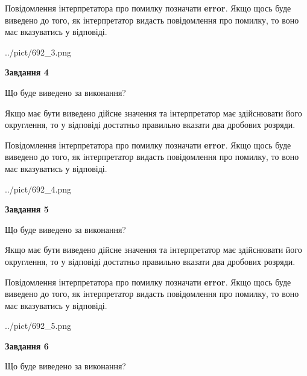 \documentclass[12pt, ukrainian]{article}
\begin{document}
{\begin {Large}
Повідомлення інтерпретатора про помилку позначати \textbf{error}.
Якщо щось буде виведено до того, як інтерпретатор видасть повідомлення про помилку, 
то воно має вказуватись у відповіді. \par

\begin{center}
	{../pict/692_3.png}
\end{center}
\newpage

{\begin {center}\textbf{Завдання 4}\end {center}}\par
Що буде виведено за виконання? \par

Якщо має бути виведено дійсне значення та інтерпретатор має здійснювати його округлення, 
то у відповіді достатньо правильно вказати два дробових розряди.

Повідомлення інтерпретатора про помилку позначати \textbf{error}.
Якщо щось буде виведено до того, як інтерпретатор видасть повідомлення про помилку, 
то воно має вказуватись у відповіді. \par

\begin{center}
	{../pict/692_4.png}
\end{center}
\newpage

{\begin {center}\textbf{Завдання 5}\end {center}}\par
Що буде виведено за виконання? \par

Якщо має бути виведено дійсне значення та інтерпретатор має здійснювати його округлення, 
то у відповіді достатньо правильно вказати два дробових розряди.

Повідомлення інтерпретатора про помилку позначати \textbf{error}.
Якщо щось буде виведено до того, як інтерпретатор видасть повідомлення про помилку, 
то воно має вказуватись у відповіді. \par

\begin{center}
	{../pict/692_5.png}
\end{center}
\newpage

{\begin {center}\textbf{Завдання 6}\end {center}}\par
Що буде виведено за виконання? \par


\end{Large}}
\end{document}
